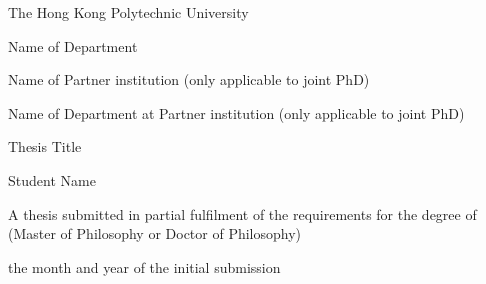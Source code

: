 \thispagestyle{empty}
\begin{center}
\Large

The Hong Kong Polytechnic University

Name of Department

Name of Partner institution (only applicable to joint PhD)

Name of Department at Partner institution (only applicable to joint PhD)

Thesis Title

Student Name

A thesis submitted in partial fulfilment of the requirements for the degree of (Master of Philosophy or Doctor of Philosophy)

the month and year of the initial submission
\end{center}